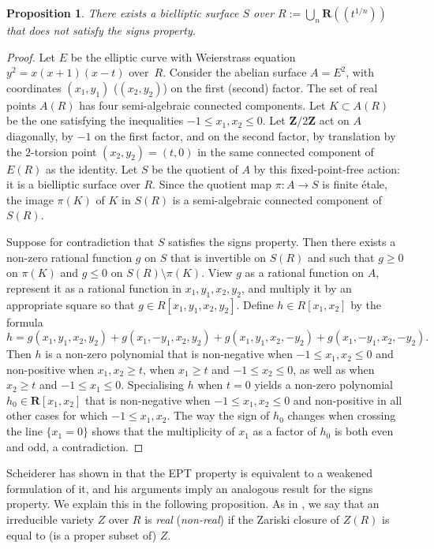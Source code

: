 \documentclass[JEP,XML,SOM,Unicode]{cedram}
\newcommand{\lpr}{(\!(}
\newcommand{\rpr}{)\!)}
\theoremstyle{plain}
\newtheorem{prop}[thm]{Proposition}
\theoremstyle{definition}
\numberwithin{equation}{section}
\newcommand{\R}{{\mathbf R}}
\newcommand{\Z}{{\mathbf Z}}
\begin{document}
\begin{prop}
\label{prop:cexsigns}
There exists a bielliptic surface $S$ over $R:=\bigcup_n\R\lpr t^{1/n}\rpr$ that does not satisfy the signs property.
\end{prop}

\begin{proof}
Let $E$ be the elliptic curve with Weierstrass equation $y^2=x(x+1)(x-t)$ over~$R$. Consider the abelian surface $A=E^2$, with coordinates $(x_1,y_1)$ (\resp $(x_2,y_2)$) on the first (\resp second) factor. The set of real points $A(R)$ has four semi-algebraic connected components. Let $K\subset A(R)$ be the one satisfying the inequalities \hbox{$-1\leq x_1,x_2\leq 0$}.
Let $\Z/2\Z$ act on $A$ diagonally, by $-1$ on the first factor, and on the second factor, by translation by the $2$-torsion point $(x_2,y_2)=(t,0)$ in the same connected component of $E(R)$ as the identity. Let $S$ be the quotient of $A$ by this fixed-point-free action: it is a bielliptic surface over $R$. Since the quotient map $\pi:A\to S$ is finite étale, the image $\pi(K)$ of $K$ in $S(R)$ is a semi-algebraic connected component of $S(R)$.\enlargethispage{-\baselineskip}%

Suppose for contradiction that $S$ satisfies the signs property. Then there exists a non-zero rational function $g$ on $S$ that is invertible on $S(R)$ and such that $g\geq 0$ on $\pi(K)$ and $g\leq 0$ on $S(R)\setminus \pi(K)$. View $g$ as a rational function on $A$, represent it as a rational function in $x_1,y_1,x_2,y_2$, and multiply it by an appropriate square
so that $g\in R[x_1,y_1,x_2,y_2]$. Define $h\in R[x_1,x_2]$ by the formula
\[
h=g(x_1,y_1,x_2,y_2)+g(x_1,-y_1,x_2,y_2)+g(x_1,y_1,x_2,-y_2)+g(x_1,-y_1,x_2,-y_2).
\]
Then $h$ is a non-zero polynomial that is non-negative when $-1\leq x_1,x_2\leq 0$ and non-positive when $x_1,x_2\geq t$, when $x_1\geq t$ and $-1\leq x_2\leq 0$, as well as when $x_2\geq t$ and $-1\leq x_1\leq 0$. Specialising $h$ when $t=0$ yields a non-zero polynomial $h_0\in\R[x_1,x_2]$ that is non-negative when $-1\leq x_1,x_2\leq 0$ and non-positive in all other cases for which $-1\leq x_1,x_2$. The way the sign of $h_0$ changes when crossing the line $\{x_1=0\}$ shows that the multiplicity of $x_1$ as a factor of $h_0$ is both even and odd, a contradiction.
\end{proof}

Scheiderer has shown in \cite[App.]{scheidererpurity} that the EPT property is equivalent to a weakened formulation of it, and his arguments imply an analogous result for the signs property. We explain this in the following proposition. As in \cite{scheidererpurity}, we say that an irreducible variety $Z$ over $R$ is \textit{real} (\resp \textit{non-real}) if the Zariski closure of $Z(R)$ is equal to (\resp is a proper subset of) $Z$.
\end{document}
